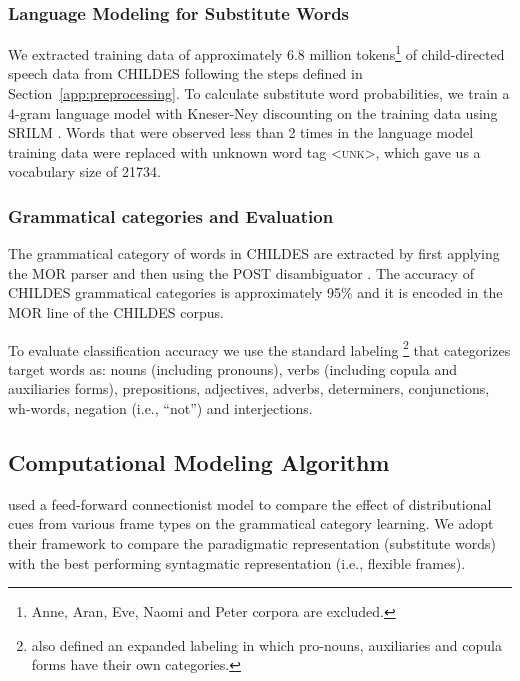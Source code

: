 \subsubsection{Language Modeling for Substitute Words}
\label{s:lm}
We extracted training data of approximately 6.8 million tokens\footnote{Anne,
Aran, Eve, Naomi and Peter corpora are excluded.} of child-directed speech data
from CHILDES following the steps defined in Section~\ref{app:preprocessing}.
To calculate substitute word probabilities, we train a 4-gram language model with
Kneser-Ney discounting on the training data using SRILM \citep*{Stolcke2002}.
Words that were observed less than 2 times in the language model training data
were replaced with unknown word tag \textsc{<unk>}, which gave us a vocabulary
size of 21734.

\subsubsection{Grammatical categories and Evaluation}
The grammatical category of words in CHILDES are extracted by first
applying the MOR parser \citep*{macwhinney2000childes} and then using
the POST disambiguator \citep*{sagae2004automatic}.  The accuracy of
CHILDES grammatical categories is approximately 95\%
\citep*{parisse2000automatic} and it is encoded in the MOR line of the
CHILDES corpus.

To evaluate classification accuracy we use the standard labeling
\citep*{Mintz200391}\footnote{\cite{Mintz200391} also defined an expanded
labeling in which pro-nouns, auxiliaries and copula forms have their own
categories.} that categorizes target words as: nouns (including pronouns), verbs
(including copula and auxiliaries forms), prepositions, adjectives, adverbs,
determiners, conjunctions, wh-words, negation (i.e., ``not'') and
interjections.



\subsection{Computational Modeling Algorithm}
\label{s:computational}
\cite{clair2010} used a feed-forward connectionist model to compare
the effect of distributional cues from various frame types on the
grammatical category learning.  We adopt their framework to compare the
paradigmatic representation (substitute words) with the best performing
syntagmatic representation (i.e., flexible frames).

